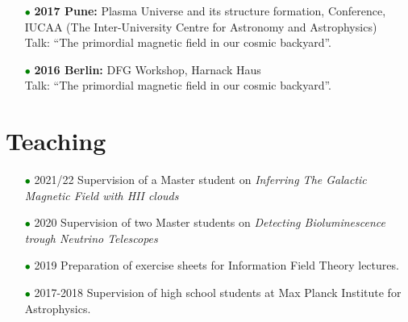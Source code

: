 \documentclass[11pt,a4paper,sans, table, dvipsnames]{moderncv}        %
\begin{document}
\begin{itemize}
\vspace{5pt}

\item[\textcolor{Green}{$\bullet$}]{\textbf{2017 Pune:} Plasma Universe and its structure formation, Conference, IUCAA (The Inter-University Centre for Astronomy and Astrophysics)\\ Talk: ``The primordial magnetic field in our cosmic backyard''.}

\vspace{5pt}

\item[\textcolor{Green}{$\bullet$}]{\textbf{2016 Berlin:} DFG Workshop, Harnack Haus\\ Talk: ``The primordial magnetic field in our cosmic backyard''.}


\end{itemize}

\section{Teaching}
\begin{itemize}
\item[\textcolor{Green}{$\bullet$}] 2021/22 Supervision of a Master student
on  \textit{Inferring The Galactic Magnetic Field with HII clouds}
\vspace{5pt}

\item[\textcolor{Green}{$\bullet$}] 2020 Supervision of two Master students on 
\textit{Detecting Bioluminescence trough Neutrino Telescopes}

\vspace{5pt}

\item[\textcolor{Green}{$\bullet$}] 2019 Preparation of exercise sheets for Information Field Theory lectures.

\vspace{5pt}

\item[\textcolor{Green}{$\bullet$}] 2017-2018 Supervision of high school students at Max Planck Institute for Astrophysics.
\end{itemize}




\end{document}
